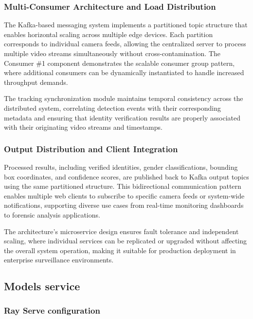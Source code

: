 \subsubsection{Multi-Consumer Architecture and Load Distribution}

The Kafka-based messaging system implements a partitioned topic structure that enables horizontal scaling across multiple edge devices. Each partition corresponds to individual camera feeds, allowing the centralized server to process multiple video streams simultaneously without cross-contamination. The Consumer \#1 component demonstrates the scalable consumer group pattern, where additional consumers can be dynamically instantiated to handle increased throughput demands.

The tracking synchronization module maintains temporal consistency across the distributed system, correlating detection events with their corresponding metadata and ensuring that identity verification results are properly associated with their originating video streams and timestamps.

\subsubsection{Output Distribution and Client Integration}

Processed results, including verified identities, gender classifications, bounding box coordinates, and confidence scores, are published back to Kafka output topics using the same partitioned structure. This bidirectional communication pattern enables multiple web clients to subscribe to specific camera feeds or system-wide notifications, supporting diverse use cases from real-time monitoring dashboards to forensic analysis applications.

The architecture's microservice design ensures fault tolerance and independent scaling, where individual services can be replicated or upgraded without affecting the overall system operation, making it suitable for production deployment in enterprise surveillance environments.


\subsection{Models service}

    \subsubsection{Ray Serve configuration}

